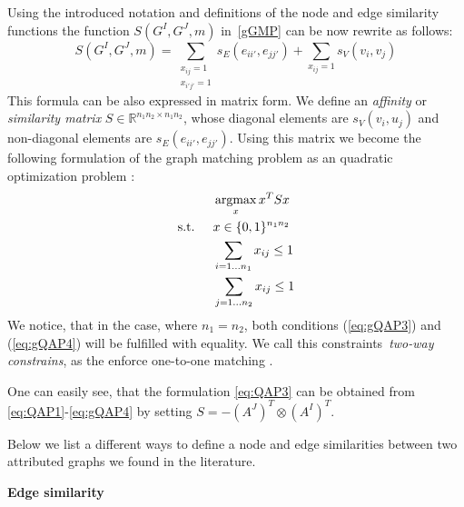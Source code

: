 Using the introduced notation and definitions of the node and edge similarity functions the function $S(G^I,G^J,m)$ in~\eqref{gGMP} can be now rewrite as follows:
\begin{equation}\label{eq:sumQAP}
	S(G^I,G^J,m)=\sum_{\substack{x_{ij}=1\\x_{i'j'}=1}}s_E(e_{ii'},e_{jj'}) + \sum_{x_{ij}=1}s_V(v_{i},v_{j})
\end{equation}
This formula can be also expressed in matrix form. We define an \emph{affinity} or \emph{similarity matrix} $S\in\mathbb{R}^{n_1n_2\times n_1n_2}$, whose diagonal elements are $s_V(v_i, u_j)$ and non-diagonal elements are $s_E(e_{ii\prime}, e_{jj\prime})$. Using this matrix we become the following formulation of the graph matching problem as an quadratic optimization problem \cite{Cho2014_Haystack, Cho2010_RRWM, Cho2012_ProgressiveGM, Conte2004,Rangarajan1996_GAGM,Leordeanu2005_SM,Leordeanu2009_IPFP}:
\begin{alignat}{2}
    &     && \argmax_x{x^TSx}                           \label{eq:gQAP1}\\ %
    & \text{s.t. } &&  x\in \{0,1\}^{n_1n_2}            \label{eq:gQAP2}\\
    &             &&  \sum_{i=1\dots n_1} x_{ij}\le 1    \label{eq:gQAP3}\\
    &             &&  \sum_{j=1\dots n_2} x_{ij}\le 1    \label{eq:gQAP4}
\end{alignat}
We notice, that in the case, where $n_1=n_2$, both conditions (\ref{eq:gQAP3}) and (\ref{eq:gQAP4}) will be fulfilled with equality. We call this constraints~\emph{two-way constrains}, as the enforce one-to-one matching .

One can easily see, that the formulation \eqref{eq:QAP3} can be obtained from \eqref{eq:QAP1}-\eqref{eq:gQAP4} by setting $S=-(A^J)^T\otimes(A^I)^T$.

Below we list a different ways to define a node and edge similarities between two attributed graphs we found in the literature.

\textbf{Edge similarity}

